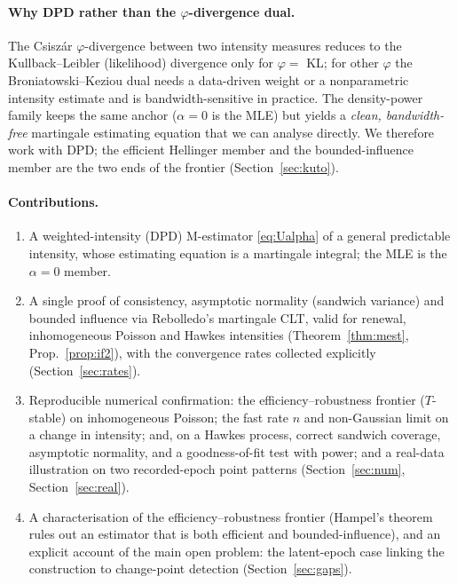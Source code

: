 \documentclass[smallextended,natbib]{svjour3}
\begin{document}
\paragraph{Why DPD rather than the $\varphi$-divergence dual.}
The Csiszár $\varphi$-divergence between two intensity measures reduces to the
Kullback--Leibler (likelihood) divergence only for $\varphi=$ KL; for other
$\varphi$ the Broniatowski--Keziou dual needs a data-driven weight or a
nonparametric intensity estimate and is bandwidth-sensitive in practice. The
density-power family keeps the same anchor ($\alpha=0$ is the MLE) but yields a
\emph{clean, bandwidth-free} martingale estimating equation that we can analyse
directly. We therefore work with DPD; the efficient Hellinger member and the
bounded-influence member are the two ends of the frontier (Section~\ref{sec:kuto}).

\paragraph{Contributions.}
\begin{enumerate}
\item A weighted-intensity (DPD) M-estimator \eqref{eq:Ualpha} of a general
predictable intensity, whose estimating equation is a martingale integral; the MLE
is the $\alpha=0$ member.
\item A single proof of consistency, asymptotic normality (sandwich variance) and
bounded influence via Rebolledo's martingale CLT, valid for renewal, inhomogeneous
Poisson and Hawkes intensities (Theorem~\ref{thm:mest}, Prop.~\ref{prop:if2}),
with the convergence rates collected explicitly (Section~\ref{sec:rates}).
\item Reproducible numerical confirmation: the efficiency--robustness frontier
($T$-stable) on inhomogeneous Poisson; the fast rate $n$ and non-Gaussian limit on
a change in intensity; and, on a Hawkes process, correct sandwich coverage,
asymptotic normality, and a goodness-of-fit test with power; and a real-data
illustration on two recorded-epoch point patterns (Section~\ref{sec:num},
Section~\ref{sec:real}).
\item A characterisation of the efficiency--robustness frontier (Hampel's theorem
rules out an estimator that is both efficient and bounded-influence), and an
explicit account of the main open problem: the latent-epoch case linking the
construction to change-point detection (Section~\ref{sec:gaps}).
\end{enumerate}
\end{document}
